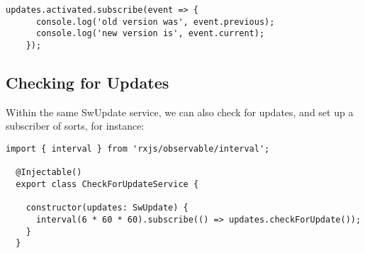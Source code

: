 \begin{lstlisting}[caption=app.routing.module.ts file]
    updates.activated.subscribe(event => {
      console.log('old version was', event.previous);
      console.log('new version is', event.current);
    });
\end{lstlisting}

\subsection{ Checking for Updates }
Within the same SwUpdate service, we can also check for updates, and set up a
subscriber of sorts, for instance:
\begin{lstlisting}[caption=app.routing.module.ts file]
  import { interval } from 'rxjs/observable/interval';

  @Injectable()
  export class CheckForUpdateService {

    constructor(updates: SwUpdate) {
      interval(6 * 60 * 60).subscribe(() => updates.checkForUpdate());
    }
  }
\end{lstlisting}
